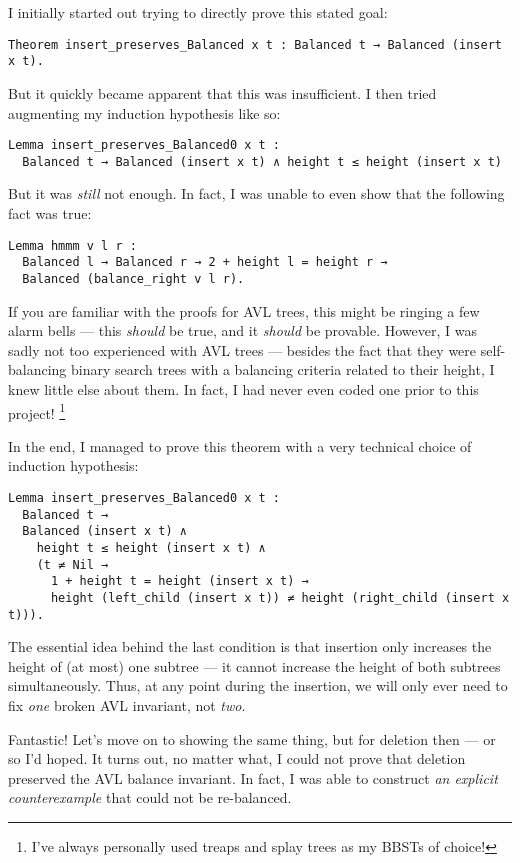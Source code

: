 \documentclass[acmsmall, authorversion, nonacm, overload]{acmart}
\begin{document}
I initially started out trying to directly prove this stated goal:
\begin{verbatim}
Theorem insert_preserves_Balanced x t : Balanced t → Balanced (insert x t).
\end{verbatim}
But it quickly became apparent that this was insufficient.
I then tried augmenting my induction hypothesis like so:
\begin{verbatim}
Lemma insert_preserves_Balanced0 x t :
  Balanced t → Balanced (insert x t) ∧ height t ≤ height (insert x t)
\end{verbatim}
But it was \emph{still} not enough.
In fact, I was unable to even show that the following fact was true:
\begin{verbatim}
Lemma hmmm v l r :
  Balanced l → Balanced r → 2 + height l = height r →
  Balanced (balance_right v l r).
\end{verbatim}
If you are familiar with the proofs for AVL trees,
this might be ringing a few alarm bells --- this \emph{should} be true, and it \emph{should} be provable.
However, I was sadly not too experienced with AVL trees --- besides the fact that they were self-balancing
binary search trees with a balancing criteria related to their height,
I knew little else about them.
In fact, I had never even coded one prior to this project!
\footnote{I've always personally used treaps and splay trees as my BBSTs of choice!}

\vspace{1em}
\noindent In the end, I managed to prove this theorem with a very technical choice of induction hypothesis:
\begin{verbatim}
Lemma insert_preserves_Balanced0 x t :
  Balanced t →
  Balanced (insert x t) ∧
    height t ≤ height (insert x t) ∧
    (t ≠ Nil →
      1 + height t = height (insert x t) →
      height (left_child (insert x t)) ≠ height (right_child (insert x t))).
\end{verbatim}
The essential idea behind the last condition is that
insertion only increases the height of (at most) one subtree ---
it cannot increase the height of both subtrees simultaneously.
Thus, at any point during the insertion, we will only ever need to
fix \emph{one} broken AVL invariant, not \emph{two}.

\vspace{1em}
\noindent Fantastic!
Let's move on to showing the same thing, but for deletion then --- or so I'd hoped.
It turns out, no matter what, I could not prove that deletion preserved the AVL balance invariant.
In fact, I was able to construct \emph{an explicit counterexample} that could not be re-balanced.
\end{document}
